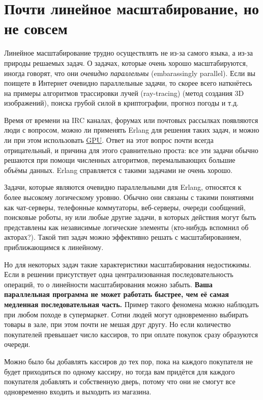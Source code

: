 \section{Почти линейное масштабирование, но не совсем}
\label{not-entirely-unlike-linear-scaling}
Линейное масштабирование трудно осуществлять не из\--за самого языка, а из\--за природы решаемых задач.
О задачах, которые очень хорошо масштабируются, иногда говорят, что они \emph{очевидно  параллельны} (embarassingly parallel).
Если вы поищете в Интернет очевидно параллельные задачи, то скорее всего наткнётесь на примеры алгоритмов трассировки лучей (ray\--tracing) (метод создания 3D изображений), поиска грубой силой в криптографии, прогноз погоды и т.д.

Время от времени на IRC каналах, форумах или почтовых рассылках появляются люди с вопросом, можно ли применять Erlang для решения таких задач, и можно ли при этом использовать \href{http://en.wikipedia.org/wiki/Graphics_Processing_Unit}{GPU}.
Ответ на этот вопрос почти всегда отрицательный, и причина для этого сравнительно проста: все эти задачи обычно решаются при помощи численных алгоритмов, перемалывающих большие объёмы данных.
Erlang справляется с такими задачами не очень хорошо.

Задачи, которые являются очевидно параллельными для Erlang, относятся к более высокому логическому уровню.
Обычно они связаны с такими понятиями как чат\--серверы, телефонные коммутаторы, веб\--серверы, очереди сообщений, поисковые роботы, ну или любые другие задачи, в которых действия могут быть представлены как независимые логические элементы (кто\--нибудь вспомнил об акторах?).
Такой тип задач можно эффективно решать с масштабированием, приближающимся к линейному.

Но для некоторых задач такие характеристики масштабирования недостижимы.
Если в решении присутствует одна централизованная последовательность операций, то о линейности масштабирования можно забыть.
\textbf{Ваша параллельная программа не может работать быстрее, чем её самая медленная последовательная часть.}
Пример такого феномена можно наблюдать при любом походе в супермаркет.
Сотни людей могут одновременно выбирать товары в зале, при этом почти не мешая друг другу.
Но если количество покупателей превышает число кассиров, то при оплате покупок сразу образуются очереди.

Можно было бы добавлять кассиров до тех пор, пока на каждого покупателя не будет приходиться по одному кассиру, но тогда вам придётся для каждого покупателя добавлять и собственную дверь, потому что они не смогут все одновременно входить и выходить из магазина.

